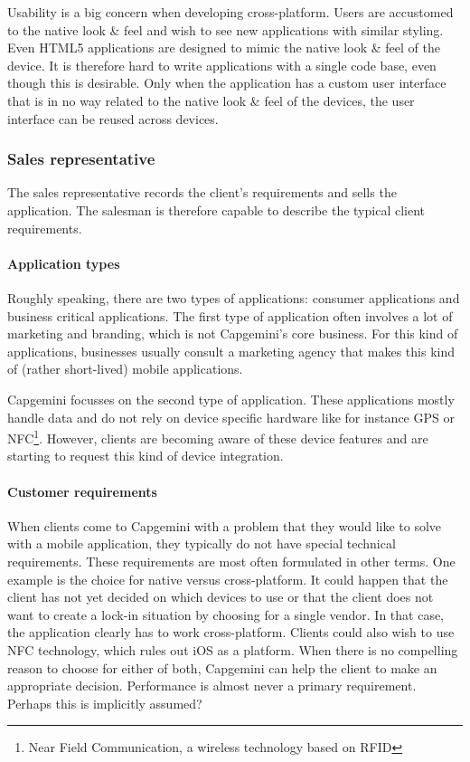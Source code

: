 Usability is a big concern when developing cross-platform. Users are accustomed to the native look \& feel and wish to see new applications with similar styling. Even HTML5 applications are designed to mimic the native look \& feel of the device. It is therefore hard to write applications with a single code base, even though this is desirable. Only when the application has a custom user interface that is in no way related to the native look \& feel of the devices, the user interface can be reused across devices.

\subsubsection{Sales representative}

The sales representative records the client's requirements and sells the application. The salesman is therefore capable to describe the typical client requirements.

\paragraph{Application types}

Roughly speaking, there are two types of applications: consumer applications and business critical applications. The first type of application often involves a lot of marketing and branding, which is not Capgemini's core business. For this kind of applications, businesses usually consult a marketing agency that makes this kind of (rather short-lived) mobile applications.

Capgemini focusses on the second type of application. These applications mostly handle data and do not rely on device specific hardware like for instance GPS or NFC\footnote{Near Field Communication, a wireless technology based on RFID}. However, clients are becoming aware of these device features and are starting to request this kind of device integration. 

\paragraph{Customer requirements} 

When clients come to Capgemini with a problem that they would like to solve with a mobile application, they typically do not have special technical requirements. These requirements are most often formulated in other terms. One example is the choice for native versus cross-platform. It could happen that the client has not yet decided on which devices to use or that the client does not want to create a lock-in situation by choosing for a single vendor. In that case, the application clearly has to work cross-platform. Clients could also wish to use NFC technology, which rules out iOS as a platform. When there is no compelling reason to choose for either of both, Capgemini can help the client to make an appropriate decision. Performance is almost never a primary requirement. Perhaps this is implicitly assumed?

